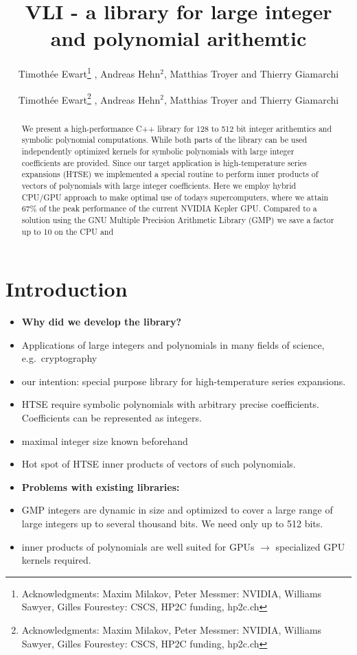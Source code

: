 \documentclass[oribibl]{llncs2e/llncs}
\author{Timoth\'ee Ewart\inst{1}\thanks{Acknowledgments: Maxim Milakov, Peter Messmer:   NVIDIA,   Williams Sawyer, Gilles Fourestey:  CSCS, HP2C funding, hp2c.ch}  , Andreas Hehn$^2$, Matthias Troyer\inst{2} and Thierry Giamarchi\inst{1}}
\institute{Universit\'e de Gen\`eve, \email{timothee.ewart@gmail.com}  \and Eidgen\"ossische Technische Hochschule Z\"urich }
\title{VLI - a library for large integer and polynomial arithemtic}
\author{Timoth\'ee Ewart\inst{1}\thanks{Acknowledgments: Maxim Milakov, Peter Messmer:   NVIDIA,   Williams Sawyer, Gilles Fourestey:  CSCS, HP2C funding, hp2c.ch}  , Andreas Hehn$^2$, Matthias Troyer\inst{2} and Thierry Giamarchi\inst{1}}
\institute{Universit\'e de Gen\`eve, \email{timothee.ewart@gmail.com}  \and Eidgen\"ossische Technische Hochschule Z\"urich }
\begin{document}
\maketitle


\begin{abstract}
We present a high-performance C++ library for 128 to 512 bit integer arithemtics and symbolic polynomial computations.
While both parts of the library can be used independently optimized kernels for symbolic polynomials with large integer coefficients are provided.
Since our target application is high-temperature series expansions (HTSE) we implemented a special routine to perform inner products of vectors of polynomials with large integer coefficients.
Here we employ hybrid CPU/GPU approach to make optimal use of todays supercomputers, where we attain 67\% of the peak performance of the current NVIDIA Kepler GPU.
Compared to a solution using the GNU Multiple Precision Arithmetic Library (GMP) we save a factor up to 10 on the CPU and
\end{abstract}

\section{Introduction}
\begin{itemize}
\item {\bf Why did we develop the library?}
\item Applications of large integers and polynomials in many fields of science, e.g.\ cryptography
\item our intention: special purpose library for high-temperature series expansions.
\item HTSE require symbolic polynomials with arbitrary precise coefficients. Coefficients can be represented as integers.
\item maximal integer size known beforehand
\item Hot spot of HTSE inner products of vectors of such polynomials.
\item {\bf Problems with existing libraries:}
\item GMP integers are dynamic in size and optimized to cover a large range of large integers up to several thousand bits. We need only up to 512 bits.
\item inner products of polynomials are well suited for GPUs $\rightarrow$ specialized GPU kernels required.
\end{itemize}
\end{document}
